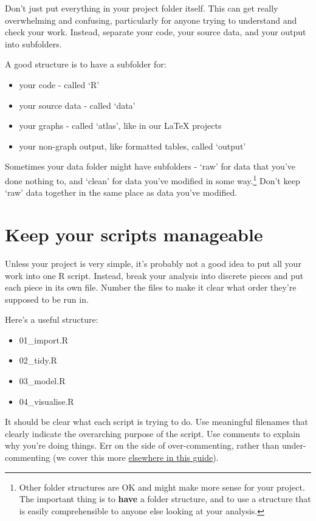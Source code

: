 \documentclass[]{book}
\providecommand{\tightlist}{%
  \setlength{\itemsep}{0pt}\setlength{\parskip}{0pt}}
\let\rmarkdownfootnote\footnote%
\def\footnote{\protect\rmarkdownfootnote}
\begin{document}
Don't just put everything in your project folder itself. This can get really overwhelming and confusing, particularly for anyone trying to understand and check your work. Instead, separate your code, your source data, and your output into subfolders.

A good structure is to have a subfolder for:

\begin{itemize}
\tightlist
\item
  your code - called `R'
\item
  your source data - called `data'
\item
  your graphs - called `atlas', like in our LaTeX projects
\item
  your non-graph output, like formatted tables, called `output'
\end{itemize}

Sometimes your data folder might have subfolders - `raw' for data that you've done nothing to, and `clean' for data you've modified in some way.\footnote{Other folder structures are OK and might make more sense for your project. The important thing is to \textbf{have} a folder structure, and to use a structure that is easily comprehensible to anyone else looking at your analysis.} Don't keep `raw' data together in the same place as data you've modified.

\hypertarget{manageable}{%
\section{Keep your scripts manageable}\label{manageable}}

Unless your project is very simple, it's probably not a good idea to put all your work into one R script. Instead, break your analysis into discrete pieces and put each piece in its own file. Number the files to make it clear what order they're supposed to be run in.

Here's a useful structure:

\begin{itemize}
\tightlist
\item
  01\_import.R
\item
  02\_tidy.R
\item
  03\_model.R
\item
  04\_visualise.R
\end{itemize}

It should be clear what each script is trying to do. Use meaningful filenames that clearly indicate the overarching purpose of the script. Use comments to explain why you're doing things. Err on the side of over-commenting, rather than under-commenting (we cover this more \protect\hyperlink{use-comments}{elsewhere in this guide}).
\end{document}
